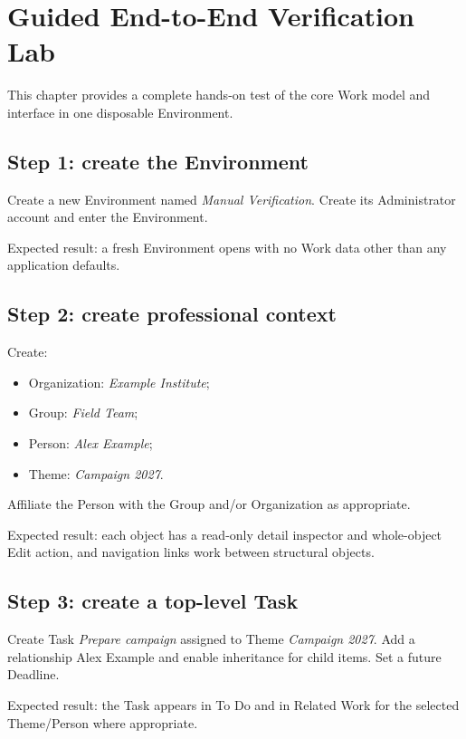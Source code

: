 \documentclass{testudomanual}
\begin{document}
\chapter{Guided End-to-End Verification Lab}

This chapter provides a complete hands-on test of the core Work model and interface in one disposable Environment.

\section{Step 1: create the Environment}

Create a new Environment named \emph{Manual Verification}. Create its Administrator account and enter the Environment.

Expected result: a fresh Environment opens with no Work data other than any application defaults.

\section{Step 2: create professional context}

Create:
\begin{itemize}
    \item Organization: \emph{Example Institute};
    \item Group: \emph{Field Team};
    \item Person: \emph{Alex Example};
    \item Theme: \emph{Campaign 2027}.
\end{itemize}
Affiliate the Person with the Group and/or Organization as appropriate.

Expected result: each object has a read-only detail inspector and whole-object Edit action, and navigation links work between structural objects.

\section{Step 3: create a top-level Task}

Create Task \emph{Prepare campaign} assigned to Theme \emph{Campaign 2027}. Add a relationship  Alex Example and enable inheritance for child items. Set a future Deadline.

Expected result: the Task appears in To Do and in Related Work for the selected Theme/Person where appropriate.
\end{document}
